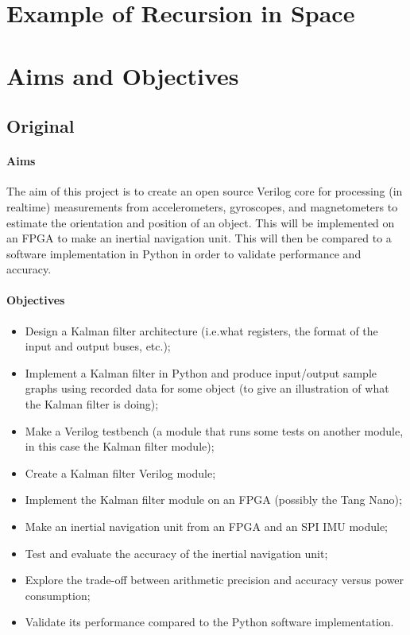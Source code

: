 \documentclass[12pt]{article}
\begin{document}
\section{Example of Recursion in Space}
\label{recursion_space}



\section{Aims and Objectives}

\subsection*{Original}

\paragraph{Aims}

The aim of this project is to create an open source Verilog core for processing (in realtime) measurements from accelerometers, gyroscopes, and magnetometers to estimate the orientation and position of an object. This will be implemented on an FPGA to make an inertial navigation unit. This will then be compared to a software implementation in Python in order to validate performance and accuracy.

\paragraph{Objectives}

\begin{itemize}[noitemsep]
	\item Design a Kalman filter architecture (i.e.\@ what registers, the format of the input and output buses, etc.);
	\item Implement a Kalman filter in Python and produce input/output sample graphs using recorded data for some object (to give an illustration of what the Kalman filter is doing);
	\item Make a Verilog testbench (a module that runs some tests on another module, in this case the Kalman filter module);
	\item Create a Kalman filter Verilog module;
	\item Implement the Kalman filter module on an FPGA (possibly the Tang Nano);
	\item Make an inertial navigation unit from an FPGA and an SPI IMU module;
	\item Test and evaluate the accuracy of the inertial navigation unit;
	\item Explore the trade-off between arithmetic precision and accuracy versus power consumption;
	\item Validate its performance compared to the Python software implementation.
\end{itemize}
\end{document}
